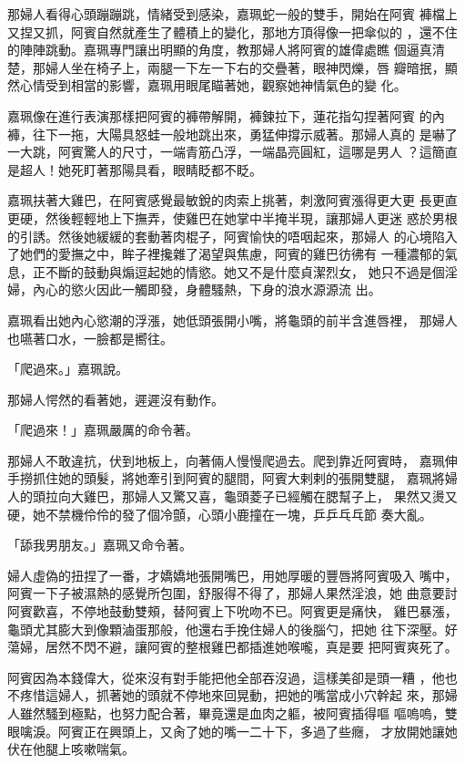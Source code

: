 那婦人看得心頭蹦蹦跳，情緒受到感染，嘉珮蛇一般的雙手，開始在阿賓
褲檔上又捏又抓，阿賓自然就產生了體積上的變化，那地方頂得像一把傘似的
，還不住的陣陣跳動。嘉珮專門讓出明顯的角度，教那婦人將阿賓的雄偉處瞧
個逼真清楚，那婦人坐在椅子上，兩腿一下左一下右的交疊著，眼神閃爍，唇
瓣暗抿，顯然心情受到相當的影響，嘉珮用眼尾瞄著她，觀察她神情氣色的變
化。

嘉珮像在進行表演那樣把阿賓的褲帶解開，褲鍊拉下，蓮花指勾捏著阿賓
的內褲，往下一拖，大陽具怒蛙一般地跳出來，勇猛伸撐示威著。那婦人真的
是嚇了一大跳，阿賓驚人的尺寸，一端青筋凸浮，一端晶亮圓紅，這哪是男人
？這簡直是超人！她死盯著那陽具看，眼睛眨都不眨。

嘉珮扶著大雞巴，在阿賓感覺最敏銳的肉索上挑著，刺激阿賓漲得更大更
長更直更硬，然後輕輕地上下撫弄，使雞巴在她掌中半掩半現，讓那婦人更迷
惑於男根的引誘。然後她緩緩的套動著肉棍子，阿賓愉快的唔咽起來，那婦人
的心境陷入了她們的愛撫之中，眸子裡攙雜了渴望與焦慮，阿賓的雞巴彷彿有
一種濃郁的氣息，正不斷的鼓動與煽逗起她的情慾。她又不是什麼貞潔烈女，
她只不過是個淫婦，內心的慾火因此一觸即發，身體騷熱，下身的浪水源源流
出。

嘉珮看出她內心慾潮的浮漲，她低頭張開小嘴，將龜頭的前半含進唇裡，
那婦人也嚥著口水，一臉都是嚮往。

「爬過來。」嘉珮說。

那婦人愕然的看著她，遲遲沒有動作。

「爬過來！」嘉珮嚴厲的命令著。

那婦人不敢違抗，伏到地板上，向著倆人慢慢爬過去。爬到靠近阿賓時，
嘉珮伸手撈抓住她的頭髮，將她牽引到阿賓的腿間，阿賓大剌剌的張開雙腿，
嘉珮將婦人的頭拉向大雞巴，那婦人又驚又喜，龜頭菱子已經觸在腮幫子上，
果然又燙又硬，她不禁機伶伶的發了個冷顫，心頭小鹿撞在一塊，乒乒乓乓節
奏大亂。

「舔我男朋友。」嘉珮又命令著。

婦人虛偽的扭捏了一番，才嬌嬌地張開嘴巴，用她厚暖的豐唇將阿賓吸入
嘴中，阿賓一下子被濕熱的感覺所包圍，舒服得不得了，那婦人果然淫浪，她
曲意要討阿賓歡喜，不停地鼓動雙頰，替阿賓上下吮吻不已。阿賓更是痛快，
雞巴暴漲，龜頭尤其膨大到像顆滷蛋那般，他還右手挽住婦人的後腦勺，把她
往下深壓。好蕩婦，居然不閃不避，讓阿賓的整根雞巴都插進她喉嚨，真是要
把阿賓爽死了。

阿賓因為本錢偉大，從來沒有對手能把他全部吞沒過，這樣美卻是頭一糟
，他也不疼惜這婦人，抓著她的頭就不停地來回晃動，把她的嘴當成小穴幹起
來，那婦人雖然騷到極點，也努力配合著，畢竟還是血肉之軀，被阿賓插得嘔
嘔嗚嗚，雙眼噙淚。阿賓正在興頭上，又肏了她的嘴一二十下，多過了些癮，
才放開她讓她伏在他腿上咳嗽喘氣。

